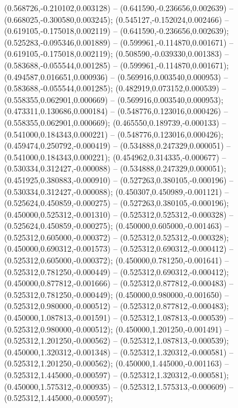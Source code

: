  (0.568726,-0.210102,0.003128) -- (0.641590,-0.236656,0.002639) -- (0.668025,-0.300580,0.003245);
 (0.545127,-0.152024,0.002466) -- (0.619105,-0.175018,0.002119) -- (0.641590,-0.236656,0.002639);
 (0.525283,-0.095346,0.001889) -- (0.599961,-0.114870,0.001671) -- (0.619105,-0.175018,0.002119);
 (0.508590,-0.039330,0.001383) -- (0.583688,-0.055544,0.001285) -- (0.599961,-0.114870,0.001671);
 (0.494587,0.016651,0.000936) -- (0.569916,0.003540,0.000953) -- (0.583688,-0.055544,0.001285);
 (0.482919,0.073152,0.000539) -- (0.558355,0.062901,0.000669) -- (0.569916,0.003540,0.000953);
 (0.473311,0.130686,0.000184) -- (0.548776,0.123016,0.000426) -- (0.558355,0.062901,0.000669);
 (0.465550,0.189739,-0.000133) -- (0.541000,0.184343,0.000221) -- (0.548776,0.123016,0.000426);
 (0.459474,0.250792,-0.000419) -- (0.534888,0.247329,0.000051) -- (0.541000,0.184343,0.000221);
 (0.454962,0.314335,-0.000677) -- (0.530334,0.312427,-0.000088) -- (0.534888,0.247329,0.000051);
 (0.451925,0.380883,-0.000910) -- (0.527263,0.380105,-0.000196) -- (0.530334,0.312427,-0.000088);
 (0.450307,0.450989,-0.001121) -- (0.525624,0.450859,-0.000275) -- (0.527263,0.380105,-0.000196);
 (0.450000,0.525312,-0.001310) -- (0.525312,0.525312,-0.000328) -- (0.525624,0.450859,-0.000275);
 (0.450000,0.605000,-0.001463) -- (0.525312,0.605000,-0.000372) -- (0.525312,0.525312,-0.000328);
 (0.450000,0.690312,-0.001573) -- (0.525312,0.690312,-0.000412) -- (0.525312,0.605000,-0.000372);
 (0.450000,0.781250,-0.001641) -- (0.525312,0.781250,-0.000449) -- (0.525312,0.690312,-0.000412);
 (0.450000,0.877812,-0.001666) -- (0.525312,0.877812,-0.000483) -- (0.525312,0.781250,-0.000449);
 (0.450000,0.980000,-0.001650) -- (0.525312,0.980000,-0.000512) -- (0.525312,0.877812,-0.000483);
 (0.450000,1.087813,-0.001591) -- (0.525312,1.087813,-0.000539) -- (0.525312,0.980000,-0.000512);
 (0.450000,1.201250,-0.001491) -- (0.525312,1.201250,-0.000562) -- (0.525312,1.087813,-0.000539);
 (0.450000,1.320312,-0.001348) -- (0.525312,1.320312,-0.000581) -- (0.525312,1.201250,-0.000562);
 (0.450000,1.445000,-0.001163) -- (0.525312,1.445000,-0.000597) -- (0.525312,1.320312,-0.000581);
 (0.450000,1.575312,-0.000935) -- (0.525312,1.575313,-0.000609) -- (0.525312,1.445000,-0.000597);

